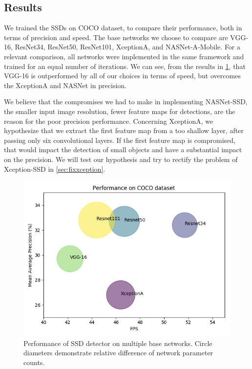 \subsection{Results}
We trained the SSDs on COCO dataset, to compare their performance, both in terms of precision and speed. The base networks we choose to compare are VGG-16, ResNet34, ResNet50, ResNet101, XceptionA, and NASNet-A-Mobile. For a relevant comparison, all networks were implemented in the same framework and trained for an equal number of iterations. We can see, from the results in \cref{fig:cocoperf}, that VGG-16 is outperformed by all of our choices in terms of speed, but overcomes the XceptionA and NASNet in precision. 

We believe that the compromises we had to make in implementing NASNet-SSD, the smaller input image resolution, fewer feature maps for detections, are the reason for the poor precision performance. Concerning XceptionA, we hypothesize that we extract the first feature map from a too shallow layer, after passing only six convolutional layers. If the first feature map is compromised, that would impact the detection of small objects and have a substantial impact on the precision. We will test our hypothesis and try to rectify the problem of Xception-SSD in \cref{sec:fixxception}.

\begin{figure}
    \centering
    \includegraphics[width=\textwidth]{img/coco_perf}
    \caption[Performance of SSD base networks on COCO dataset]{Performance of SSD detector on multiple base networks. Circle diameters demonstrate relative difference of network parameter counts.}
    \label{fig:cocoperf}
\end{figure}

